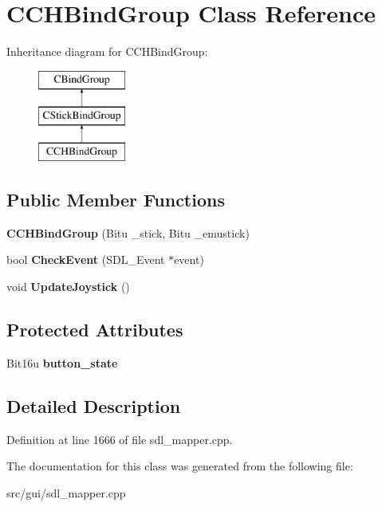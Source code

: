 \hypertarget{classCCHBindGroup}{\section{C\-C\-H\-Bind\-Group Class Reference}
\label{classCCHBindGroup}
}
Inheritance diagram for C\-C\-H\-Bind\-Group\-:\begin{figure}[H]
\begin{center}
\leavevmode
\includegraphics[height=3.000000cm]{classCCHBindGroup}
\end{center}
\end{figure}
\subsection*{Public Member Functions}
\begin{DoxyCompactItemize}
\item 
\hypertarget{classCCHBindGroup_a86bb3a7458f395324aae896cbe02f4dd}{{\bfseries C\-C\-H\-Bind\-Group} (Bitu \-\_\-stick, Bitu \-\_\-emustick)}\label{classCCHBindGroup_a86bb3a7458f395324aae896cbe02f4dd}

\item 
\hypertarget{classCCHBindGroup_a33b9f9ced9bf284c83219c33aa81bfe0}{bool {\bfseries Check\-Event} (S\-D\-L\-\_\-\-Event $\ast$event)}\label{classCCHBindGroup_a33b9f9ced9bf284c83219c33aa81bfe0}

\item 
\hypertarget{classCCHBindGroup_a11232134bcf2b6f8257f8103d34d2a13}{void {\bfseries Update\-Joystick} ()}\label{classCCHBindGroup_a11232134bcf2b6f8257f8103d34d2a13}

\end{DoxyCompactItemize}
\subsection*{Protected Attributes}
\begin{DoxyCompactItemize}
\item 
\hypertarget{classCCHBindGroup_a0d3a52894ed32833a5942a5b0e507c56}{Bit16u {\bfseries button\-\_\-state}}\label{classCCHBindGroup_a0d3a52894ed32833a5942a5b0e507c56}

\end{DoxyCompactItemize}


\subsection{Detailed Description}


Definition at line 1666 of file sdl\-\_\-mapper.\-cpp.



The documentation for this class was generated from the following file\-:\begin{DoxyCompactItemize}
\item 
src/gui/sdl\-\_\-mapper.\-cpp\end{DoxyCompactItemize}
